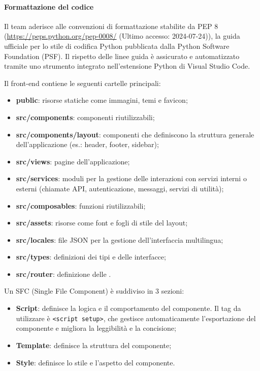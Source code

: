 \paragraph*{Formattazione del codice}
\par Il team aderisce alle convenzioni di formattazione stabilite da PEP 8 (\href{https://peps.python.org/pep-0008/}{https://peps.python.org/pep-0008/} (Ultimo accesso: 2024-07-24)), la guida ufficiale per lo stile di codifica Python pubblicata dalla Python Software Foundation (PSF). Il rispetto delle linee guida è assicurato e automatizzato tramite uno strumento integrato nell'estensione Python di Visual Studio Code.

\par Il front-end contiene le seguenti cartelle principali:
\begin{itemize}
  \item \textbf{public}: risorse statiche come immagini, temi e favicon;
  \item \textbf{src/components}: componenti riutilizzabili;
  \item \textbf{src/components/layout}: componenti che definiscono la struttura generale dell'applicazione (es.: header, footer, sidebar);
  \item \textbf{src/views}: pagine dell'applicazione;
  \item \textbf{src/services}: moduli per la gestione delle interazioni con servizi interni o esterni (chiamate API, autenticazione, messaggi, servizi di utilità);
  \item \textbf{src/composables}: funzioni riutilizzabili;
  \item \textbf{src/assets}: risorse come font e fogli di stile del layout;
  \item \textbf{src/locales}: file JSON per la gestione dell'interfaccia multilingua;
  \item \textbf{src/types}: definizioni dei tipi e delle interfacce;
  \item \textbf{src/router}: definizione delle .
\end{itemize}

\par Un SFC (Single File Component) è suddiviso in 3 sezioni:
\begin{itemize}
  \item \textbf{Script}: definisce la logica e il comportamento del componente. Il tag da utilizzare è \verb|<script setup>|, che gestisce automaticamente l'esportazione del componente e migliora la leggibilità e la concisione;
  \item \textbf{Template}: definisce la struttura del componente;
  \item \textbf{Style}: definisce lo stile e l'aspetto del componente.
\end{itemize}

